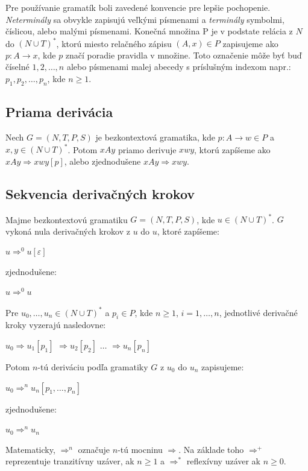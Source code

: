 Pre používanie gramatík boli zavedené konvencie pre lepšie pochopenie. \textit{Neterminály} sa obvykle zapisujú veľkými písmenami a \textit{terminály} symbolmi, číslicou, alebo malými písmenami. Konečná množina P je v podstate relácia z $N$ do $(N \cup T)^\ast$, ktorú miesto relačného zápisu $(A, x) \in P$ zapisujeme ako $p: A \to x$, kde $p$ značí poradie pravidla v množine. Toto označenie môže byť buď číselné $1, 2, \dots, n$ alebo písmenami malej abecedy s príslušným indexom napr.: $p_1, p_2, \dots, p_n$, kde $n \geq 1$.

\subsection{Priama derivácia}
Nech $G = (N, T, P, S)$ je bezkontextová gramatika, kde $p: A \to w \in P$ a $x, y \in (N \cup T)^\ast$. Potom $xAy$ priamo derivuje $xwy$, ktorú zapíšeme ako $xAy \Rightarrow xwy [p]$, alebo zjednodušene $xAy \Rightarrow xwy$.

\subsection{Sekvencia derivačných krokov}
Majme bezkontextovú gramatiku $G = (N, T, P, S)$, kde $u \in (N \cup T)^\ast$. $G$ vykoná nula derivačných krokov z $u$ do $u$, ktoré zapíšeme:
\begin{center}
$u \Rightarrow^0 u [\varepsilon]$
\end{center} 

zjednodušene:
\begin{center}
$u \Rightarrow^0 u$
\end{center} 

Pre $u_0, \dots, u_n \in (N \cup T)^\ast$ a $p_i \in P$, kde $n \geq 1$, $i = 1, \dots, n$, jednotlivé derivačné kroky vyzerajú nasledovne:
\begin{center}
$u_0 \Rightarrow u_1 [p_1]$
$\Rightarrow u_2 [p_2]$
$\dots$
$\Rightarrow u_n [p_n]$
\end{center} 

Potom $n$-tú deriváciu podľa gramatiky $G$ z $u_0$ do $u_n$ zapisujeme:
\begin{center}
$u_0 \Rightarrow^n u_n [p_1, \dots, p_n]$
\end{center} 

zjednodušene:
\begin{center}
$u_0 \Rightarrow^n u_n$
\end{center}

Matematicky, $\Rightarrow^n$ označuje $n$-tú mocninu $\Rightarrow$. Na základe toho $\Rightarrow^+$ reprezentuje tranzitívny uzáver, ak $n \geq 1$ a $\Rightarrow^\ast$ reflexívny uzáver ak $n \geq 0$.

